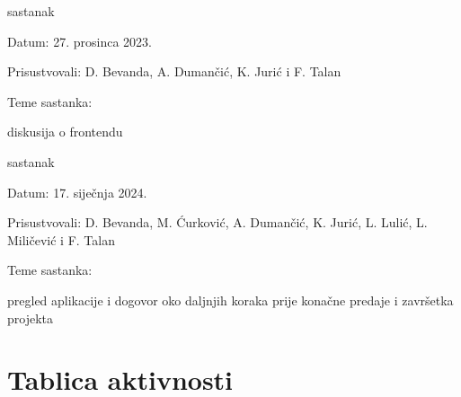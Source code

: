 \begin{packed_enum}
			\item  sastanak
			\item[] \begin{packed_item}
				\item Datum: 27. prosinca 2023.
				\item Prisustvovali: D. Bevanda, A. Dumančić, K. Jurić i F. Talan
				\item Teme sastanka:
				\begin{packed_item}
					\item diskusija o frontendu
				\end{packed_item}
			\end{packed_item}
			
			\item  sastanak
			\item[] \begin{packed_item}
				\item Datum: 17. siječnja 2024.
				\item Prisustvovali: D. Bevanda, M. Ćurković, A. Dumančić, K. Jurić, L. Lulić, L. Miličević i F. Talan
				\item Teme sastanka:
				\begin{packed_item}
					\item pregled aplikacije i dogovor oko daljnjih koraka prije konačne predaje i završetka projekta
				\end{packed_item}
			\end{packed_item}
			


		\end{packed_enum}

		\eject
		\section*{Tablica aktivnosti}


